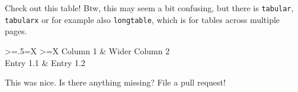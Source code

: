 \noindent Check out this table! Btw, this may seem a bit confusing, but there is \texttt{tabular}, \texttt{tabularx} or for example also \texttt{longtable}, which is for tables across multiple pages.

\begin{table}
\begin{tabularx}{\textwidth}{{
  >{\hsize=.5\hsize\linewidth=\hsize}X
  >{\hsize\linewidth=\hsize}X
}}
\toprule
Column 1 & Wider Column 2 
\\
\midrule
Entry 1.1 & Entry 1.2 
\\
\bottomrule
\end{tabularx}
\caption{The caption of your table.}
\label{tab:example}
\end{table}

\noindent This was nice. Is there anything missing? File a pull request!
